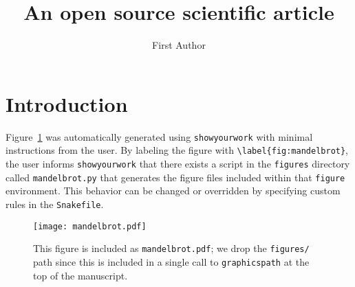 \documentclass[twocolumn]{aastex631}
\begin{document}
\title{An open source scientific article}

\author{First Author}

\begin{abstract}
    \blindtext
\end{abstract}

\graphicspath{{./figures/}}

\section{Introduction}

Figure~\ref{fig:mandelbrot} was automatically generated using \texttt{showyourwork} with minimal instructions from the user.
By labeling the figure with \verb+\label{fig:mandelbrot}+, the user informs \texttt{showyourwork} that there exists a script in the \texttt{figures} directory called \texttt{mandelbrot.py} that generates the figure files included within that \texttt{figure} environment.
This behavior can be changed or overridden by specifying custom rules in the \texttt{Snakefile}.

\begin{figure}[ht!]
    \begin{centering}
        \texttt{[image: mandelbrot.pdf]}
        \caption{
            This figure is included as \texttt{mandelbrot.pdf}; we drop
            the \texttt{figures/} path since this is included in a single
            call to \texttt{graphicspath} at the top of the manuscript.
        }
        \label{fig:mandelbrot}
    \end{centering}
\end{figure}
\end{document}
